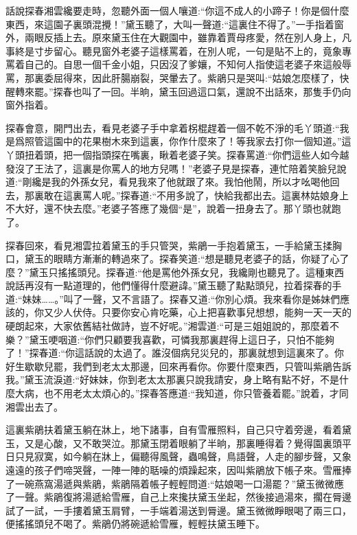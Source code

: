 


\begin{parag}
    話說探春湘雲纔要走時，忽聽外面一個人嚷道:“你這不成人的小蹄子！你是個什麼東西，來這園子裏頭混攪！”黛玉聽了，大叫一聲道:“這裏住不得了。”一手指着窗外，兩眼反插上去。原來黛玉住在大觀園中，雖靠着賈母疼愛，然在別人身上，凡事終是寸步留心。聽見窗外老婆子這樣罵着，在別人呢，一句是貼不上的，竟象專罵着自己的。自思一個千金小姐，只因沒了爹孃，不知何人指使這老婆子來這般辱罵，那裏委屈得來，因此肝腸崩裂，哭暈去了。紫鵑只是哭叫:“姑娘怎麼樣了，快醒轉來罷。”探春也叫了一回。半晌，黛玉回過這口氣，還說不出話來，那隻手仍向窗外指着。
\end{parag}


\begin{parag}
    探春會意，開門出去，看見老婆子手中拿着柺棍趕着一個不乾不淨的毛丫頭道:“我是爲照管這園中的花果樹木來到這裏，你作什麼來了！等我家去打你一個知道。”這丫頭扭着頭，把一個指頭探在嘴裏，瞅着老婆子笑。探春罵道:“你們這些人如今越發沒了王法了，這裏是你罵人的地方兒嗎！”老婆子見是探春，連忙陪着笑臉兒說道:“剛纔是我的外孫女兒，看見我來了他就跟了來。我怕他鬧，所以才吆喝他回去，那裏敢在這裏罵人呢。”探春道:“不用多說了，快給我都出去。這裏林姑娘身上不大好，還不快去麼。”老婆子答應了幾個“是”，說着一扭身去了。那丫頭也就跑了。
\end{parag}


\begin{parag}
    探春回來，看見湘雲拉着黛玉的手只管哭，紫鵑一手抱着黛玉，一手給黛玉揉胸口，黛玉的眼睛方漸漸的轉過來了。探春笑道:“想是聽見老婆子的話，你疑了心了麼？”黛玉只搖搖頭兒。探春道:“他是罵他外孫女兒，我纔剛也聽見了。這種東西說話再沒有一點道理的，他們懂得什麼避諱。”黛玉聽了點點頭兒，拉着探春的手道:“妹妹……。”叫了一聲，又不言語了。探春又道:“你別心煩。我來看你是姊妹們應該的，你又少人伏侍。只要你安心肯吃藥，心上把喜歡事兒想想，能夠一天一天的硬朗起來，大家依舊結社做詩，豈不好呢。”湘雲道:“可是三姐姐說的，那麼着不樂？”黛玉哽咽道:“你們只顧要我喜歡，可憐我那裏趕得上這日子，只怕不能夠了！”探春道:“你這話說的太過了。誰沒個病兒災兒的，那裏就想到這裏來了。你好生歇歇兒罷，我們到老太太那邊，回來再看你。你要什麼東西，只管叫紫鵑告訴我。”黛玉流淚道:“好妹妹，你到老太太那裏只說我請安，身上略有點不好，不是什麼大病，也不用老太太煩心的。”探春答應道:“我知道，你只管養着罷。”說着，才同湘雲出去了。
\end{parag}


\begin{parag}
    這裏紫鵑扶着黛玉躺在牀上，地下諸事，自有雪雁照料，自己只守着旁邊，看着黛玉，又是心酸，又不敢哭泣。那黛玉閉着眼躺了半晌，那裏睡得着？覺得園裏頭平日只見寂寞，如今躺在牀上，偏聽得風聲，蟲鳴聲，鳥語聲，人走的腳步聲，又象遠遠的孩子們啼哭聲，一陣一陣的聒噪的煩躁起來，因叫紫鵑放下帳子來。雪雁捧了一碗燕窩湯遞與紫鵑，紫鵑隔着帳子輕輕問道:“姑娘喝一口湯罷？”黛玉微微應了一聲。紫鵑復將湯遞給雪雁，自己上來攙扶黛玉坐起，然後接過湯來，擱在脣邊試了一試，一手摟着黛玉肩臂，一手端着湯送到脣邊。黛玉微微睜眼喝了兩三口，便搖搖頭兒不喝了。紫鵑仍將碗遞給雪雁，輕輕扶黛玉睡下。
\end{parag}


